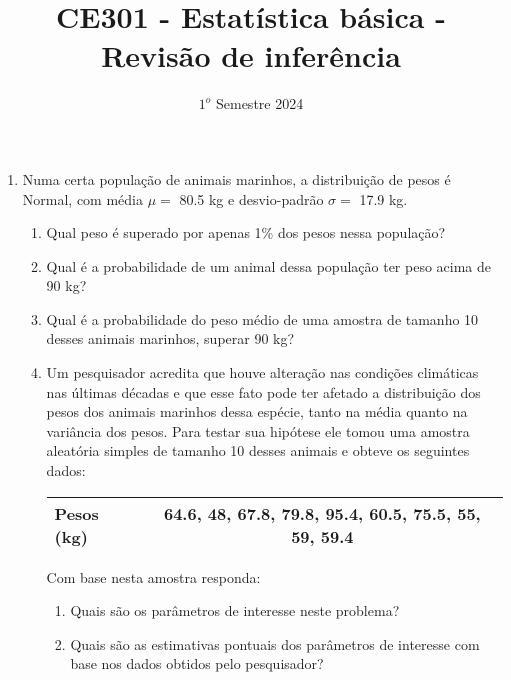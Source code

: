 \documentclass[
]{article}
\title{CE301 - Estatística básica - Revisão de inferência}
\author{}
\date{\vspace{-2.5em}\(1^o\) Semestre 2024}
\begin{document}
\maketitle

\begin{enumerate}

\item Numa certa população de animais marinhos, a distribuição de pesos é Normal, com média $\mu=$ 80.5 kg e desvio-padrão $\sigma=$ 17.9 kg.
\begin{enumerate}
\item Qual peso é superado por apenas 1\% dos pesos nessa população? 


\item Qual é a probabilidade de um animal dessa população ter peso acima de 90 kg? 



%

\item Qual é a probabilidade do peso médio de uma amostra de tamanho 10 desses animais marinhos, superar 90 kg?


\item Um pesquisador acredita que houve alteração nas condições climáticas nas últimas décadas e que esse fato pode ter afetado a distribuição dos pesos dos animais marinhos dessa espécie, tanto na média quanto na variância dos pesos. Para testar sua hipótese ele tomou uma amostra aleatória simples de tamanho 10 desses animais e obteve os seguintes dados: 

\begin{center}
\begin{tabular}{lc}
\hline
Pesos (kg)&64.6, 48, 67.8, 79.8, 95.4, 60.5, 75.5, 55, 59, 59.4 \\
\hline
\end{tabular}
\end{center}

Com base nesta amostra responda:
\begin{enumerate}
\item Quais são os parâmetros de interesse neste problema?

\item Quais são as estimativas pontuais dos parâmetros de interesse com base nos dados obtidos pelo pesquisador?


\end{enumerate}
\end{enumerate}
\end{enumerate}
\end{document}
